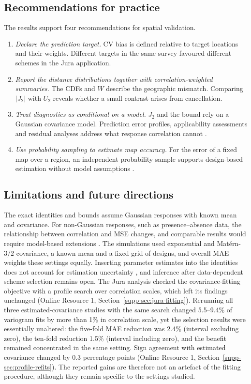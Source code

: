 \subsection{Recommendations for practice}
The results support four recommendations for spatial validation.
\begin{enumerate}
\item \emph{Declare the prediction target.} CV bias is defined relative to target locations and their weights. Different targets in the same survey favoured different schemes in the Jura application.
\item \emph{Report the distance distributions together with correlation-weighted summaries.} The CDFs and $W$ describe the geographic mismatch. Comparing $|J_2|$ with $U_2$ reveals whether a small contrast arises from cancellation.
\item \emph{Treat diagnostics as conditional on a model.} $J_2$ and the bound rely on a Gaussian covariance model. Prediction error profiles, applicability assessments and residual analyses address what response correlation cannot \citep{brenning2023profiles,meyer2021aoa}.
\item \emph{Use probability sampling to estimate map accuracy.} For the error of a fixed map over a region, an independent probability sample supports design-based estimation without model assumptions \citep{wadoux2021spatial}.
\end{enumerate}

\subsection{Limitations and future directions}
The exact identities and bounds assume Gaussian responses with known mean and covariance. For non-Gaussian responses, such as presence--absence data, the relationship between correlation and MSE changes, and comparable results would require model-based extensions \citep{diggle1998model}. The simulations used exponential and Mat\'ern-$3/2$ covariance, a known mean and a fixed grid of designs, and overall MAE weights these settings equally. Inserting parameter estimates into the identities does not account for estimation uncertainty \citep{zimmerman1992mspe}, and inference after data-dependent scheme selection remains open.
The Jura analysis checked the covariance-fitting objective with a profile search over correlation scales, which left its findings unchanged (Online Resource 1, Section~\ref*{supp-sec:jura-fitting}). Rerunning all three estimated-covariance studies with the same search changed 5.5--9.4\% of variogram fits by more than 1\% in correlation scale, yet the selection results were essentially unaltered: the five-fold MAE reduction was 2.4\% (interval excluding zero), the ten-fold reduction 1.5\% (interval including zero), and the benefit remained concentrated in the same setting. Sign agreement with estimated covariance changed by 0.3 percentage points (Online Resource 1, Section~\ref*{supp-sec:profile-refits}). The reported gains are therefore not an artefact of the fitting procedure, although they remain specific to the settings studied.

